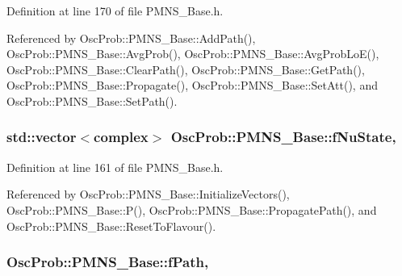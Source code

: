 Definition at line 170 of file P\+M\+N\+S\+\_\+\+Base.\+h.



Referenced by Osc\+Prob\+::\+P\+M\+N\+S\+\_\+\+Base\+::\+Add\+Path(), Osc\+Prob\+::\+P\+M\+N\+S\+\_\+\+Base\+::\+Avg\+Prob(), Osc\+Prob\+::\+P\+M\+N\+S\+\_\+\+Base\+::\+Avg\+Prob\+Lo\+E(), Osc\+Prob\+::\+P\+M\+N\+S\+\_\+\+Base\+::\+Clear\+Path(), Osc\+Prob\+::\+P\+M\+N\+S\+\_\+\+Base\+::\+Get\+Path(), Osc\+Prob\+::\+P\+M\+N\+S\+\_\+\+Base\+::\+Propagate(), Osc\+Prob\+::\+P\+M\+N\+S\+\_\+\+Base\+::\+Set\+Att(), and Osc\+Prob\+::\+P\+M\+N\+S\+\_\+\+Base\+::\+Set\+Path().

\subsubsection[{\texorpdfstring{f\+Nu\+State}{fNuState}}]{\setlength{\rightskip}{0pt plus 5cm}std\+::vector$<${\bf complex}$>$ Osc\+Prob\+::\+P\+M\+N\+S\+\_\+\+Base\+::f\+Nu\+State\hspace{0.3cm}{\ttfamily [protected]}, {\ttfamily [inherited]}}\hypertarget{classOscProb_1_1PMNS__Base_ad38a7107c3ab393591fd5ba21658300b}{}\label{classOscProb_1_1PMNS__Base_ad38a7107c3ab393591fd5ba21658300b}


Definition at line 161 of file P\+M\+N\+S\+\_\+\+Base.\+h.



Referenced by Osc\+Prob\+::\+P\+M\+N\+S\+\_\+\+Base\+::\+Initialize\+Vectors(), Osc\+Prob\+::\+P\+M\+N\+S\+\_\+\+Base\+::\+P(), Osc\+Prob\+::\+P\+M\+N\+S\+\_\+\+Base\+::\+Propagate\+Path(), and Osc\+Prob\+::\+P\+M\+N\+S\+\_\+\+Base\+::\+Reset\+To\+Flavour().

\subsubsection[{\texorpdfstring{f\+Path}{fPath}}]{ Osc\+Prob\+::\+P\+M\+N\+S\+\_\+\+Base\+::f\+Path\hspace{0.3cm}{\ttfamily [protected]}, {\ttfamily [inherited]}}\hypertarget{classOscProb_1_1PMNS__Base_a849437aa8891fe042e86886ce8f81c6e}{}\label{classOscProb_1_1PMNS__Base_a849437aa8891fe042e86886ce8f81c6e}


